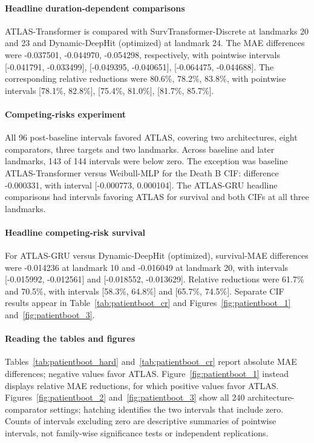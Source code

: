 \paragraph{Headline duration-dependent comparisons} ATLAS-Transformer is compared with SurvTransformer-Discrete at landmarks 20 and 23 and Dynamic-DeepHit (optimized) at landmark 24. The MAE differences were -0.037501, -0.044970, -0.054298, respectively, with pointwise intervals [-0.041791, -0.033499], [-0.049395, -0.040651], [-0.064475, -0.044688]. The corresponding relative reductions were 80.6\%, 78.2\%, 83.8\%, with pointwise intervals [78.1\%, 82.8\%], [75.4\%, 81.0\%], [81.7\%, 85.7\%].

\paragraph{Competing-risks experiment} All 96 post-baseline intervals favored ATLAS, covering two architectures, eight comparators, three targets and two landmarks. Across baseline and later landmarks, 143 of 144 intervals were below zero. The exception was baseline ATLAS-Transformer versus Weibull-MLP for the Death B CIF: difference -0.000331, with interval [-0.000773, 0.000104]. The ATLAS-GRU headline comparisons had intervals favoring ATLAS for survival and both CIFs at all three landmarks.

\paragraph{Headline competing-risk survival} For ATLAS-GRU versus Dynamic-DeepHit (optimized), survival-MAE differences were -0.014236 at landmark 10 and -0.016049 at landmark 20, with intervals [-0.015992, -0.012561] and [-0.018552, -0.013629]. Relative reductions were 61.7\% and 70.5\%, with intervals [58.3\%, 64.8\%] and [65.7\%, 74.5\%]. Separate CIF results appear in Table~\ref{tab:patientboot_cr} and Figures~\ref{fig:patientboot_1} and~\ref{fig:patientboot_3}.

\paragraph{Reading the tables and figures} Tables~\ref{tab:patientboot_hard} and~\ref{tab:patientboot_cr} report absolute MAE differences; negative values favor ATLAS. Figure~\ref{fig:patientboot_1} instead displays relative MAE reductions, for which positive values favor ATLAS. Figures~\ref{fig:patientboot_2} and~\ref{fig:patientboot_3} show all 240 architecture-comparator settings; hatching identifies the two intervals that include zero. Counts of intervals excluding zero are descriptive summaries of pointwise intervals, not family-wise significance tests or independent replications.

